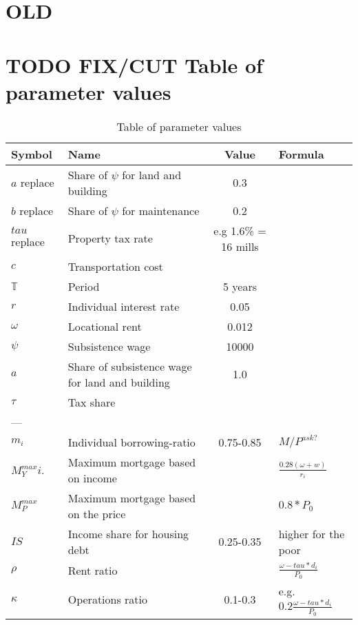 \section{OLD}

\section{TODO FIX/CUT Table of parameter values}
\renewcommand{\arraystretch}{2}
\begin{longtable}{lp{5cm}cp{2.5cm}}
\caption{Table of parameter values}\label{tab:parameters}\\
\hline 
Symbol         & Name                                 & Value      & Formula  \\ \hline
$a$ replace    & Share of $\psi$ for land and building &   0.3         & \\
$b$ replace    & Share of $\psi$ for maintenance       &   0.2         & \\
$tau$ replace  & Property tax rate &  e.g 1.6\% = 16 mills             & \\
$c$       & Transportation cost & \\
$\mathbb{T}$       & Period & 5 years      \\
$r$       & Individual interest rate & 0.05 \\
$\omega$  & Locational rent & 0.012  \\
$\psi$    & Subsistence wage & 10000 \\
$a$       & Share of subsistence wage for land and building & 1.0 \\
$\tau$       & Tax share & \\

---       &  & \\
$m_i$          & Individual borrowing-ratio           & 0.75-0.85  & $M/P^{ask?}$ \\
$M^{max}_Yi$.  & Maximum mortgage based on income     &            & $\frac{0.28(\omega+w)}{r_i}$ \\
 $M^{max}_P$   & Maximum mortgage based on the price  &            & $0.8*P_0$ \\
$IS$           & Income share for housing debt        & 0.25-0.35  & higher for the poor \\
$\rho$         & Rent ratio                           &            & $\frac{\omega-tau*d_i}{P_0}$ \\
$\kappa $      & Operations ratio                     & 0.1-0.3    & e.g. $ 0.2\frac{\omega-tau*d_i}{P_0}$ \\


\end{longtable}

